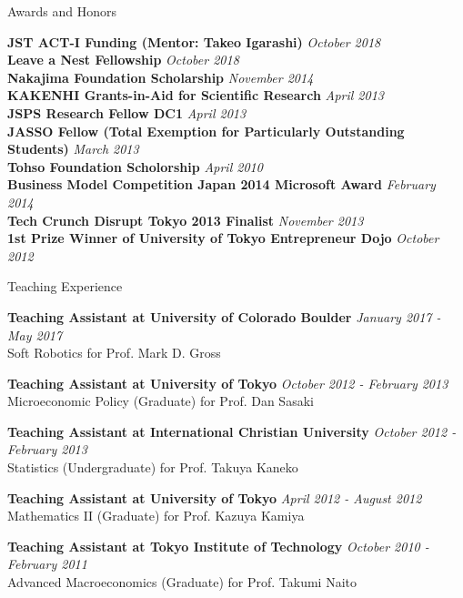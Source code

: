 \documentclass{resume} %
\begin{document}
\begin{rSection}{Awards and Honors}

{\bf JST ACT-I Funding (Mentor: Takeo Igarashi)} \hfill {\em October 2018} \\
{\bf Leave a Nest Fellowship} \hfill {\em October 2018} \\
{\bf Nakajima Foundation Scholarship} \hfill {\em November 2014} \\
{\bf KAKENHI Grants-in-Aid for Scientific Research} \hfill {\em April 2013} \\
{\bf JSPS Research Fellow DC1} \hfill {\em April 2013} \\
{\bf JASSO Fellow (Total Exemption for Particularly Outstanding Students) } \hfill {\em March 2013} \\
{\bf Tohso Foundation Scholorship} \hfill {\em April 2010} \\

{\bf Business Model Competition Japan 2014 Microsoft Award} \hfill {\em February 2014} \\
{\bf Tech Crunch Disrupt Tokyo 2013 Finalist} \hfill {\em November 2013} \\
{\bf 1st Prize Winner of University of Tokyo Entrepreneur Dojo} \hfill {\em October 2012} \\
\end{rSection}


\begin{rSection}{Teaching Experience}

{\bf Teaching Assistant at University of Colorado Boulder} \hfill {\em January 2017 - May 2017} \\
Soft Robotics for Prof. Mark D. Gross

{\bf Teaching Assistant at University of Tokyo} \hfill {\em October 2012 - February 2013} \\
Microeconomic Policy (Graduate) for Prof. Dan Sasaki

{\bf Teaching Assistant at International Christian University} \hfill {\em October 2012 - February 2013} \\
Statistics (Undergraduate) for Prof. Takuya Kaneko

{\bf Teaching Assistant at University of Tokyo} \hfill {\em April 2012 - August 2012} \\
Mathematics II (Graduate) for Prof. Kazuya Kamiya

{\bf Teaching Assistant at Tokyo Institute of Technology} \hfill {\em October 2010 - February 2011} \\
Advanced Macroeconomics (Graduate) for Prof. Takumi Naito

\end{rSection}
\end{document}
